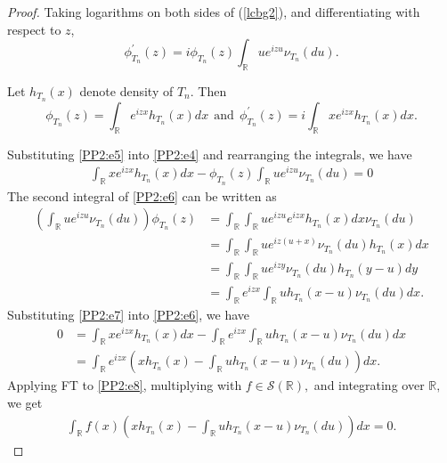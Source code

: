 \documentclass[12pt, a4paper,reqno]{amsart}
\theoremstyle{definition}
\theoremstyle{myremark}
\numberwithin{equation}{section}
\begin{document}
\vspace{-.6cm}
\begin{proof}
	Taking logarithms on both sides of (\ref{lcbg2}), and differentiating with respect to $z$,
	\begin{equation}\label{PP2:e4}
	\phi^{\prime}_{T_n}(z)=i\phi_{T_n}(z)\int_{\mathbb{R}}ue^{izu}\nu_{T_n}(du).
	\end{equation}
	
	\noindent
	Let $h_{T_n}(x)$ denote density of $T_n$. Then
	\begin{equation}\label{PP2:e5}
	\phi_{T_n}(z)=\displaystyle\int_{\mathbb{R}}e^{izx}h_{T_n}(x)dx~~\text{and}~~\phi^{\prime}_{T_n}(z)=i\displaystyle\int_{\mathbb{R}}xe^{izx}h_{T_n}(x)dx.
	\end{equation}
	
	\noindent
	Substituting \eqref{PP2:e5} into  \eqref{PP2:e4} and rearranging the integrals, we have
	\begin{align}	
	\displaystyle\int_{\mathbb{R}}xe^{izx}h_{T_n}(x)dx-\phi_{T_n}(z)\int_{\mathbb{R}}ue^{izu}\nu_{T_n}(du)=0\label{PP2:e6}
	\end{align}
	\noindent
	The second integral of \eqref{PP2:e6} can be written as
	\begin{align}
	\nonumber \left(\int_{\mathbb R}ue^{izu}\nu_{T_n}(du)\right)\phi_{T_n}(z)&=\int_{\mathbb R}\int_{\mathbb R}ue^{izu}e^{izx}h_{T_n}(x)dx\nu_{T_n}(du)\\
	\nonumber &=\int_{\mathbb R}\int_{\mathbb R}ue^{iz(u+x)}\nu_{T_n}(du)h_{T_n}(x)dx\\
	\nonumber &=\int_{\mathbb R}\int_{\mathbb R}ue^{izy}\nu_{T_n}(du)h_{T_n}(y-u)dy\\
	&=\int_{\mathbb R}e^{izx}\int_{\mathbb R}uh_{T_n}(x-u)\nu_{T_n}(du)dx.\label{PP2:e7}
	\end{align}
	\noindent
	Substituting \eqref{PP2:e7} into \eqref{PP2:e6}, we have
	\begin{align}
	\nonumber	0&=\displaystyle\int_{\mathbb{R}}xe^{izx}h_{T_n}(x)dx-\int_{\mathbb R}e^{izx}\int_{\mathbb R}uh_{T_n}(x-u)\nu_{T_n}(du)dx\\
	&=\displaystyle\int_{\mathbb{R}}e^{izx} \left( xh_{T_n}(x)-\int_{\mathbb R}uh_{T_n}(x-u)\nu_{T_n}(du) \right)dx. \label{PP2:e8}
	\end{align}
	\noindent
	Applying FT to \eqref{PP2:e8}, multiplying with $f\in \mathcal{S}(\mathbb{R}),$ and integrating over $\mathbb{R},$ we get
		\begin{align}\label{PP2:e9}
	\displaystyle\int_{\mathbb{R}}f(x) \left( xh_{T_n}(x)-\int_{\mathbb R}uh_{T_n}(x-u)\nu_{T_n}(du) \right)dx=0.

\end{align}
\end{proof}
\end{document}
